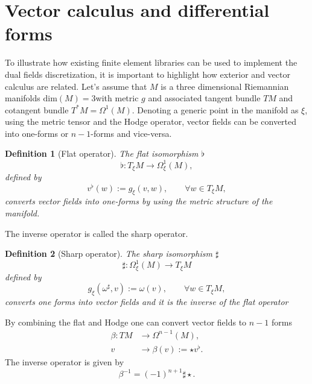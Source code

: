 \documentclass{elsarticle}
\newtheorem{definition}{Definition}
\begin{document}
\section{Vector calculus and differential forms}\label{app:vec_ext}
To illustrate how existing finite element libraries can be used to implement the dual fields discretization, it is important to highlight how exterior and vector calculus are related. Let's assume that $M$ is a three dimensional Riemannian manifolds $\mathrm{dim}(M)=3$with metric $g$ and associated tangent bundle $TM$ and cotangent bundle $T^*M =\Omega^1(M)$. Denoting a generic point in the manifold as
$\xi$, using the metric tensor and the Hodge operator, vector fields can be converted into one-forms or $n-1$-forms and vice-versa.

\begin{definition}[Flat operator]
The flat isomorphism $\flat$ 
\begin{equation}
    \flat: T_\xi M \rightarrow \Omega^1_\xi(M),
\end{equation}
defined by
\begin{equation}
v^\flat(w):= g_\xi(v, w), \qquad \forall w \in T_\xi M,
\end{equation}
converts vector fields into one-forms by using the metric structure of the manifold.
\end{definition}
The inverse operator is called the sharp operator.
\begin{definition}[Sharp operator]
The sharp isomorphism $\sharp$
\begin{equation}
    \sharp: \Omega^1_\xi(M) \rightarrow T_\xi M
\end{equation}
defined by
\begin{equation}
    g_\xi(\omega^\sharp, v) := \omega(v), \qquad \forall w \in T_\xi M,
\end{equation}
converts one forms into vector fields and it is the inverse of the flat operator
\end{definition}
By combining the flat and Hodge one can convert vector fields to $n-1$ forms
\begin{equation}
\begin{aligned}
    \beta: T M &\rightarrow \Omega^{n-1}(M), \\
             v &\rightarrow  \beta(v):= \star v^\flat.
\end{aligned}
\end{equation}
The inverse operator is given by
\begin{equation}
    \beta^{-1}= (-1)^{n+1} \sharp \star.  
\end{equation}
\end{document}
